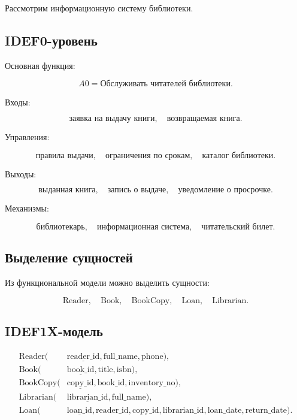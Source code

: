 \documentclass[12pt,a4paper]{article}
\theoremstyle{remark}
\begin{document}
Рассмотрим информационную систему библиотеки.

\subsection{IDEF0-уровень}

Основная функция:

\[
    A0 = \text{Обслуживать читателей библиотеки}.
\]

Входы:

\[
    \text{заявка на выдачу книги}, \quad \text{возвращаемая книга}.
\]

Управления:

\[
    \text{правила выдачи}, \quad \text{ограничения по срокам}, \quad \text{каталог библиотеки}.
\]

Выходы:

\[
    \text{выданная книга}, \quad \text{запись о выдаче}, \quad \text{уведомление о просрочке}.
\]

Механизмы:

\[
    \text{библиотекарь}, \quad \text{информационная система}, \quad \text{читательский билет}.
\]

\subsection{Выделение сущностей}

Из функциональной модели можно выделить сущности:

\[
    \text{Reader}, \quad \text{Book}, \quad \text{BookCopy}, \quad \text{Loan}, \quad \text{Librarian}.
\]

\subsection{IDEF1X-модель}

\[
\begin{aligned}
    \text{Reader}(&\underline{\text{reader\_id}}, \text{full\_name}, \text{phone}),\\
    \text{Book}(&\underline{\text{book\_id}}, \text{title}, \text{isbn}),\\
    \text{BookCopy}(&\underline{\text{copy\_id}}, \text{book\_id}, \text{inventory\_no}),\\
    \text{Librarian}(&\underline{\text{librarian\_id}}, \text{full\_name}),\\
    \text{Loan}(&\underline{\text{loan\_id}}, \text{reader\_id}, \text{copy\_id}, \text{librarian\_id}, \text{loan\_date}, \text{return\_date}).
\end{aligned}
\]
\end{document}
